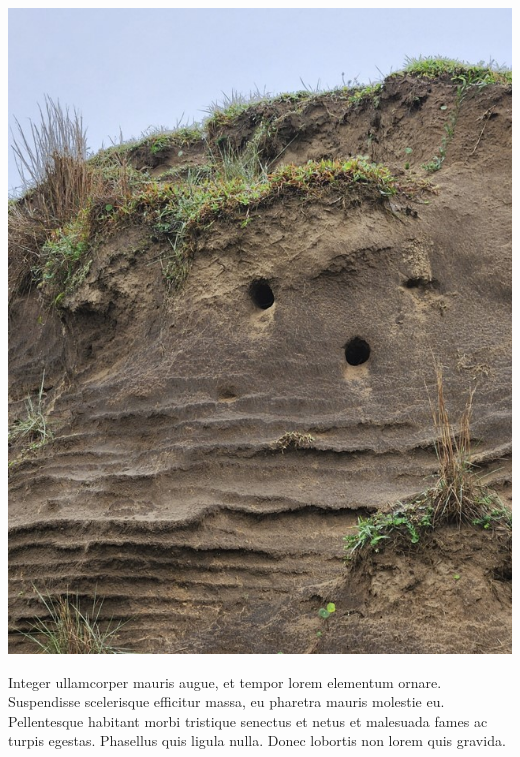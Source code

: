 \documentclass[./main.tex]{subfiles}
\begin{document}
\nolinenumbers

\newpage
\renewcommand{\headrulewidth}{0pt}
\thispagestyle{fancy}
\fancyhf{} %
\fancyfoot{} %
\fancyfoot[C]{\thepage}

\par \hfill
\vspace{40mm}
\begin{adjustwidth}{45pt}{45pt}
\begin{center}
    \includegraphics[scale=0.7]{figs/fig_tucos.jpg}\\
\end{center}
\vspace{10mm}
\noindent \textsf{Integer ullamcorper mauris augue, et tempor lorem elementum ornare. Suspendisse scelerisque efficitur massa, eu pharetra mauris molestie eu. Pellentesque habitant morbi tristique senectus et netus et malesuada fames ac turpis egestas. Phasellus quis ligula nulla. Donec lobortis non lorem quis gravida.}
\end{adjustwidth}
\clearpage
\end{document}
